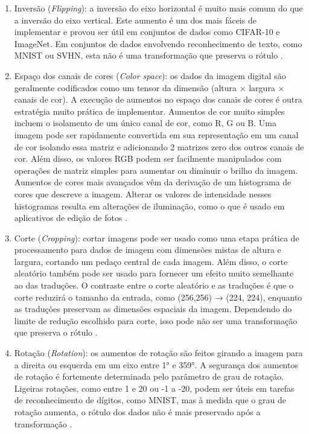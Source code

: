 \documentclass[
	12pt,				%
	oneside,			%
	a4paper,			%
	english,			%
	brazil				%
	]{abntex2ppgsi}
\begin{document}
\begin{enumerate}
  \item Inversão (\textit{Flipping}): a inversão do eixo horizontal é muito mais comum do que a inversão do eixo vertical. Este aumento é um dos mais fáceis de implementar e provou ser útil em conjuntos de dados como CIFAR-10 e ImageNet. Em conjuntos de dados envolvendo reconhecimento de texto, como MNIST ou SVHN, esta não é uma transformação que preserva o rótulo \cite{shorten2019survey}.
  
  \item Espaço dos canais de cores (\textit{Color space}): os dados da imagem digital são geralmente codificados como um tensor da dimensão (altura × largura × canais de cor). A execução de aumentos no espaço dos canais de cores é outra estratégia muito prática de implementar. Aumentos de cor muito simples incluem o isolamento de um único canal de cor, como R, G ou B. Uma imagem pode ser rapidamente convertida em sua representação em um canal de cor isolando essa matriz e adicionando 2 matrizes zero dos outros canais de cor. Além disso, os valores RGB podem ser facilmente manipulados com operações de matriz simples para aumentar ou diminuir o brilho da imagem. Aumentos de cores mais avançados vêm da derivação de um histograma de cores que descreve a imagem. Alterar os valores de intensidade nesses histogramas resulta em alterações de iluminação, como o que é usado em aplicativos de edição de fotos \cite{shorten2019survey}.
  
  \item Corte (\textit{Cropping}): cortar imagens pode ser usado como uma etapa prática de processamento para dados de imagem com dimensões mistas de altura e largura, cortando um pedaço central de cada imagem. Além disso, o corte aleatório também pode ser usado para fornecer um efeito muito semelhante ao das traduções. O contraste entre o corte aleatório e as traduções é que o corte reduzirá o tamanho da entrada, como (256,256) → (224, 224), enquanto as traduções preservam as dimensões espaciais da imagem. Dependendo do limite de redução escolhido para corte, isso pode não ser uma transformação que preserva o rótulo \cite{shorten2019survey}.
  
  \item Rotação (\textit{Rotation}): os aumentos de rotação são feitos girando a imagem para a direita ou esquerda em um eixo entre 1° e 359°. A segurança dos aumentos de rotação é fortemente determinada pelo parâmetro de grau de rotação. Ligeiras rotações, como entre 1 e 20 ou -1 a -20, podem ser úteis em tarefas de reconhecimento de dígitos, como MNIST, mas à medida que o grau de rotação aumenta, o rótulo dos dados não é mais preservado após a transformação \cite{shorten2019survey}.
  

\end{enumerate}
\end{document}
